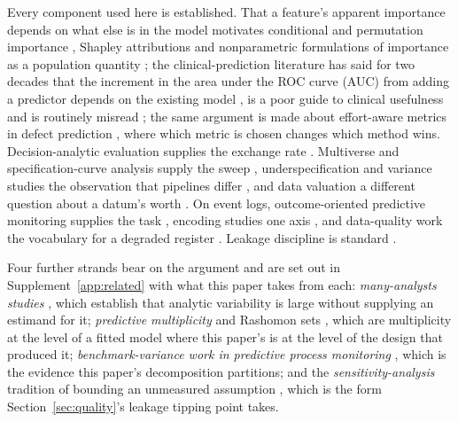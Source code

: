 \documentclass[preprint,12pt,authoryear]{elsarticle}
\theoremstyle{definition}
\begin{document}
Every component used here is established. That a feature's apparent
importance depends on what else is in the model motivates conditional and
permutation importance \citep{strobl2008conditional,fisher2019models},
Shapley attributions \citep{lundberg2017unified,covert2020sage} and
nonparametric formulations of importance as a population quantity
\citep{williamson2021vimp}; the clinical-prediction literature has said for
two decades that the increment in the area under the ROC curve (AUC) from adding a predictor depends on the
existing model \citep{pencina2008evaluating,cook2007roc}, is a poor guide to
clinical usefulness \citep{cook2007roc,vickers2008decision} and is routinely
misread \citep{kerr2011evaluating}; the same argument is made about
effort-aware metrics in defect prediction \citep{carka2022effortaware}, where
which metric is chosen changes which method wins. Decision-analytic evaluation supplies the
exchange rate \citep{vickers2006dca,vickers2016net,vickers2019simple}.
Multiverse and specification-curve analysis supply the sweep
\citep{steegen2016increasing,simonsohn2020specification,patel2015assessment},
underspecification and variance studies the observation that pipelines differ
\citep{damour2022underspecification,bouthillier2021variance}, and data
valuation a different question about a datum's worth
\citep{ghorbani2019data,jia2019towards}. On event logs, outcome-oriented
predictive monitoring supplies the task
\citep{teinemaa2019outcome,verenich2019survey,senderovich2017intercase},
encoding studies one axis \citep{liu2025encoding}, and
data-quality work the vocabulary for a degraded register
\citep{suriadi2017imperfection,mohammed2025dataquality,comuzzi2025labels}.
Leakage discipline is standard
\citep{kaufman2012leakage,kapoor2023leakage,weytjens2022leakage}.

Four further strands bear on the argument and are set out in
Supplement~\ref{app:related} with what this paper takes from each:
\emph{many-analysts studies} \citep{silberzahn2018many,breznau2022observing},
which establish that analytic variability is large without supplying an
estimand for it; \emph{predictive multiplicity} and Rashomon sets
\citep{marx2020predictive,semenova2022existence}, which are multiplicity at
the level of a fitted model where this paper's is at the level of the design
that produced it; \emph{benchmark-variance work in predictive process
monitoring} \citep{ramamaneiro2021deep}, which is the evidence this paper's
decomposition partitions; and the \emph{sensitivity-analysis} tradition of
bounding an unmeasured assumption \citep{vanderweele2017sensitivity}, which is
the form Section~\ref{sec:quality}'s leakage tipping point takes.
\end{document}
